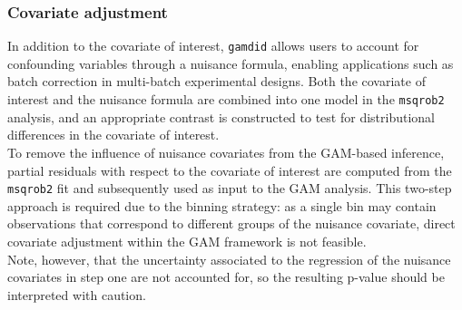\subsubsection{Covariate adjustment}
In addition to the covariate of interest, \texttt{gamdid} allows users to account for confounding variables through a nuisance formula, enabling applications such as batch correction in multi-batch experimental designs. Both the covariate of interest and the nuisance formula are combined into one model in the \texttt{msqrob2} analysis, and an appropriate contrast is constructed to test for distributional differences in the covariate of interest.\\ 
To remove the influence of nuisance covariates from the GAM-based inference, partial residuals with respect to the covariate of interest are computed from the \texttt{msqrob2} fit and subsequently used as input to the GAM analysis. This two-step approach is required due to the binning strategy: as a single bin may contain observations that correspond to different groups of the nuisance covariate, direct covariate adjustment within the GAM framework is not feasible.\\
Note, however, that the uncertainty associated to the regression of the nuisance covariates in step one are not accounted for, so the resulting p-value should be interpreted with caution. 

